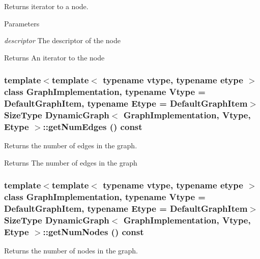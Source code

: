 Returns iterator to a node. 


\begin{DoxyParams}{Parameters}
\item[{\em descriptor}]The descriptor of the node \end{DoxyParams}
\begin{DoxyReturn}{Returns}
An iterator to the node 
\end{DoxyReturn}
\hypertarget{class_dynamic_graph_a3a57f9cd640cba12352a22e0e4410654}{
\subsubsection[{getNumEdges}]{\setlength{\rightskip}{0pt plus 5cm}template$<$template$<$ typename vtype, typename etype $>$ class GraphImplementation, typename Vtype  = DefaultGraphItem, typename Etype  = DefaultGraphItem$>$ SizeType {\bf DynamicGraph}$<$ GraphImplementation, Vtype, Etype $>$::getNumEdges () const}}
\label{class_dynamic_graph_a3a57f9cd640cba12352a22e0e4410654}


Returns the number of edges in the graph. 

\begin{DoxyReturn}{Returns}
The number of edges in the graph 
\end{DoxyReturn}
\hypertarget{class_dynamic_graph_ac2a52e7af5a154a54282f816bf9af54e}{
\subsubsection[{getNumNodes}]{\setlength{\rightskip}{0pt plus 5cm}template$<$template$<$ typename vtype, typename etype $>$ class GraphImplementation, typename Vtype  = DefaultGraphItem, typename Etype  = DefaultGraphItem$>$ SizeType {\bf DynamicGraph}$<$ GraphImplementation, Vtype, Etype $>$::getNumNodes () const}}
\label{class_dynamic_graph_ac2a52e7af5a154a54282f816bf9af54e}


Returns the number of nodes in the graph. 


